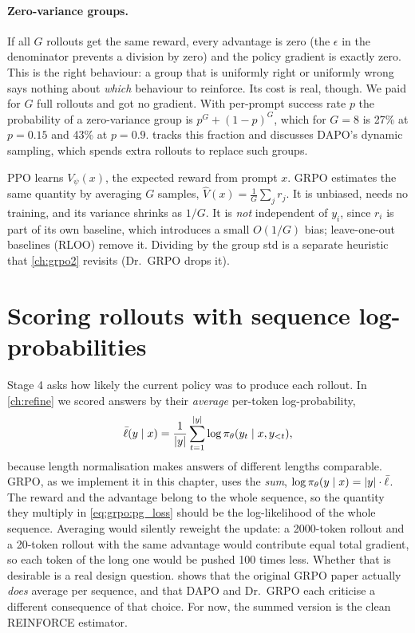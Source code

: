 \paragraph{Zero-variance groups.} If all $G$ rollouts get the same reward, every advantage
is zero (the $\epsilon$ in the denominator prevents a division by zero) and the policy
gradient is exactly zero. This is the right behaviour: a group that is uniformly right or
uniformly wrong says nothing about \emph{which} behaviour to reinforce. Its cost is real,
though. We paid for $G$ full rollouts and got no gradient. With per-prompt success rate $p$
the probability of a zero-variance group is $p^G+(1-p)^G$, which for $G=8$ is 27\% at
$p=0.15$ and 43\% at $p=0.9$.  tracks this fraction and discusses DAPO's
dynamic sampling, which spends extra rollouts to replace such groups.

\begin{keyidea}
PPO learns $V_\psi(x)$, the expected reward from prompt $x$. GRPO estimates the same
quantity by averaging $G$ samples, $\hat V(x)=\frac1G\sum_j r_j$. It is unbiased, needs no
training, and its variance shrinks as $1/G$. It is \emph{not} independent of $y_i$, since
$r_i$ is part of its own baseline, which introduces a small $O(1/G)$ bias; leave-one-out
baselines (RLOO) remove it. Dividing by the group std is a separate heuristic that
\cref{ch:grpo2} revisits (Dr.~GRPO drops it).
\end{keyidea}

\section{Scoring rollouts with sequence log-probabilities}\label{sec:grpo:logprobs}

Stage 4 asks how likely the current policy was to produce each rollout. In
\cref{ch:refine} we scored answers by their \emph{average} per-token log-probability,
\begin{equation}
\bar\ell(y\mid x)=\frac1{|y|}\sum_{t=1}^{|y|}\log\pi_\theta(y_t\mid x,y_{<t}),
\end{equation}
because length normalisation makes answers of different lengths comparable. GRPO, as we
implement it in this chapter, uses the \emph{sum}, $\log\pi_\theta(y\mid x)=|y|\cdot\bar\ell$.
The reward and the advantage belong to the whole sequence, so the quantity they multiply in
\cref{eq:grpo:pg_loss} should be the log-likelihood of the whole sequence. Averaging would
silently reweight the update: a 2000-token rollout and a 20-token rollout with the same
advantage would contribute equal total gradient, so each token of the long one would be
pushed 100 times less. Whether that is desirable is a real design question.
 shows that the original GRPO paper actually \emph{does} average per sequence,
and that DAPO and Dr.~GRPO each criticise a different consequence of that choice. For now,
the summed version is the clean REINFORCE estimator.


